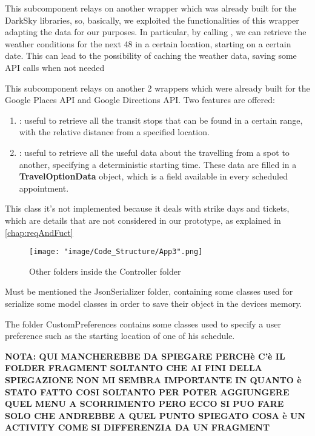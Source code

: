 This subcomponent relays on another wrapper which was already built for the DarkSky libraries, so, basically, we exploited the functionalities of this wrapper adapting the data for our purposes. In particular, by calling , we can retrieve the weather conditions for the next 48 in a certain location, starting on a certain date. This can lead to the possibility of caching the weather data, saving some API calls when not needed

This subcomponent relays on another 2 wrappers which were already built for the Google Places API and Google Directions API. Two features are offered:

\begin{enumerate}
\item {}: useful to retrieve all the transit stops that can be found in a certain range, with the relative distance from a specified location.
\item {}: useful to retrieve all the useful data about the travelling from a spot to another, specifying a deterministic starting time. These data are filled in a \textbf{TravelOptionData} object, which is a field available in every scheduled appointment.
\end{enumerate}

This class it's not implemented because it deals with strike days and tickets, which are details that are not considered in our prototype, as explained in \ref{chap:reqAndFuct}


\begin{figure}[H]
\begin{center}
\texttt{[image: "image/Code\_Structure/App3".png]}
\caption{Other folders inside the Controller folder}
\end{center}
\end{figure}

Must be mentioned the JsonSerializer folder, containing some classes used for serialize some model classes in order to save their object in the devices memory.

The folder CustomPreferences contains some classes used to specify a user preference such as the starting location of one of his schedule.

\textbf{NOTA: QUI MANCHEREBBE DA SPIEGARE PERCHè C'è IL FOLDER FRAGMENT SOLTANTO CHE AI FINI DELLA SPIEGAZIONE NON MI SEMBRA IMPORTANTE IN QUANTO è STATO FATTO COSI SOLTANTO PER POTER AGGIUNGERE QUEL MENU A SCORRIMENTO PERO ECCO SI PUO FARE SOLO CHE ANDREBBE A QUEL PUNTO SPIEGATO COSA è UN ACTIVITY COME SI DIFFERENZIA DA UN FRAGMENT}